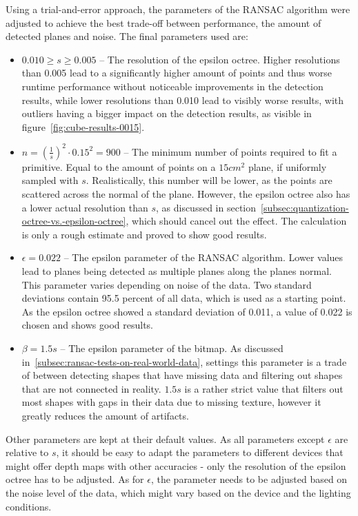 Using a trial-and-error approach, the parameters of the RANSAC algorithm were adjusted to achieve the best trade-off between
performance, the amount of detected planes and noise.
The final parameters used are:
\begin{itemize}
    \item $0.010\geq s \geq 0.005$ -- The resolution of the epsilon octree.
    Higher resolutions than 0.005 lead to a significantly higher amount of points and thus worse runtime performance without noticeable improvements in the detection results,
    while lower resolutions than 0.010 lead to visibly worse results, with outliers having a bigger impact on the detection results, as visible in figure~\ref{fig:cube-results-0015}.
    \item $n=\left(\frac{1}{s}\right)^2\cdot0.15^2=900$ -- The minimum number of points required to fit a primitive.
    Equal to the amount of points on a $15cm^2$ plane, if uniformly sampled with $s$.
    Realistically, this number will be lower, as the points are scattered across the normal of the plane.
    However, the epsilon octree also has a lower actual resolution than $s$, as discussed in section~\ref{subsec:quantization-octree-vs.-epsilon-octree},
    which should cancel out the effect.
    The calculation is only a rough estimate and proved to show good results.
    \item $\epsilon=0.022$ -- The epsilon parameter of the RANSAC algorithm.
    Lower values lead to planes being detected as multiple planes along the planes normal.
    This parameter varies depending on noise of the data.
    Two standard deviations contain 95.5 percent of all data, which is used as a starting point.
    As the epsilon octree showed a standard deviation of 0.011, a value of 0.022 is chosen and shows good results.
    \item $\beta=1.5s$ -- The epsilon parameter of the bitmap.
    As discussed in~\ref{subsec:ransac-tests-on-real-world-data}, settings this parameter is a trade of between detecting shapes that have missing data and filtering out shapes that are not connected in reality.
    $1.5s$ is a rather strict value that filters out most shapes with gaps in their data due to missing texture, however it greatly reduces the amount of artifacts.
\end{itemize}
Other parameters are kept at their default values.
As all parameters except $\epsilon$ are relative to $s$,
it should be easy to adapt the parameters to different devices that might offer depth maps with other accuracies -
only the resolution of the epsilon octree has to be adjusted.
As for $\epsilon$, the parameter needs to be adjusted based on the noise level of the data, which might vary based on the device and the lighting conditions.


